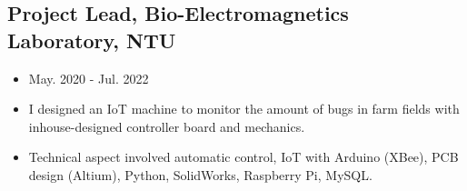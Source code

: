 \documentclass[12pt]{article}
\begin{document}
        \subsection*{Project Lead, Bio-Electromagnetics Laboratory, NTU}
        {\sffamily
        \begin{itemize}
            \item May. 2020 - Jul. 2022
            \item I designed an IoT machine to monitor the amount of bugs in farm fields with inhouse-designed controller board and mechanics.
            \item Technical aspect involved automatic control, IoT with Arduino (XBee), PCB design (Altium), Python, SolidWorks, Raspberry Pi, MySQL.
        \end{itemize}
        }
\end{document}

